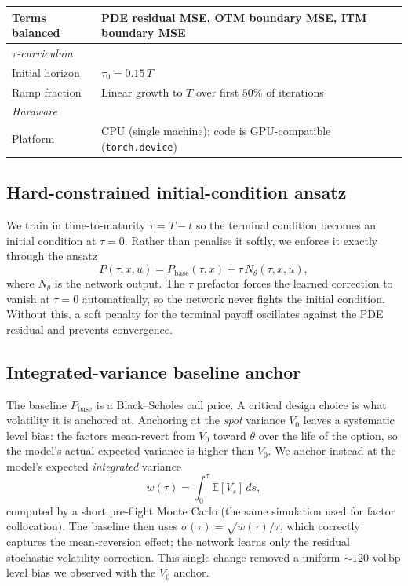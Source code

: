 \documentclass[review,12pt]{elsarticle}
\newcommand{\bp}{\ensuremath{\,\mathrm{bp}}}
\begin{document}
\begin{table}[t]
\begin{tabular}{ll}
Terms balanced & PDE residual MSE, OTM boundary MSE, ITM boundary MSE \\
\midrule
\multicolumn{2}{l}{\textit{$\tau$-curriculum}} \\
Initial horizon & $\tau_0 = 0.15\,T$ \\
Ramp fraction & Linear growth to $T$ over first $50\%$ of iterations \\
\midrule
\multicolumn{2}{l}{\textit{Hardware}} \\
Platform & CPU (single machine); code is GPU-compatible (\texttt{torch.device}) \\
\bottomrule
\end{tabular}
\end{table}

\subsection{Hard-constrained initial-condition ansatz}
\label{sec:ansatz}
We train in time-to-maturity $\tau = T-t$ so the terminal condition becomes an
initial condition at $\tau{=}0$.  Rather than penalise it softly, we enforce it
exactly through the ansatz
\begin{equation}
  P(\tau,x,u) = P_{\mathrm{base}}(\tau,x) + \tau\,N_\theta(\tau,x,u),
  \label{eq:ansatz}
\end{equation}
where $N_\theta$ is the network output.  The $\tau$ prefactor forces the
learned correction to vanish at $\tau{=}0$ automatically, so the network never
fights the initial condition.  Without this, a soft penalty for the terminal
payoff oscillates against the PDE residual and prevents convergence.

\subsection{Integrated-variance baseline anchor}
\label{sec:baseline}
The baseline $P_{\mathrm{base}}$ is a Black--Scholes call price.  A critical
design choice is what volatility it is anchored at.  Anchoring at the
\emph{spot} variance $V_0$ leaves a systematic level bias: the factors mean-revert
from $V_0$ toward $\theta$ over the life of the option, so the model's actual
expected variance is higher than $V_0$.  We anchor instead at the model's expected
\emph{integrated} variance
\begin{equation}
  w(\tau) = \int_0^\tau \mathbb{E}[V_s]\,ds,
  \label{eq:intvar}
\end{equation}
computed by a short pre-flight Monte Carlo (the same simulation used for factor
collocation).  The baseline then uses $\sigma(\tau) = \sqrt{w(\tau)/\tau}$, which
correctly captures the mean-reversion effect; the network learns only the residual
stochastic-volatility correction.  This single change removed a uniform ${\sim}120$
vol\bp{} level bias we observed with the $V_0$ anchor.
\end{document}
